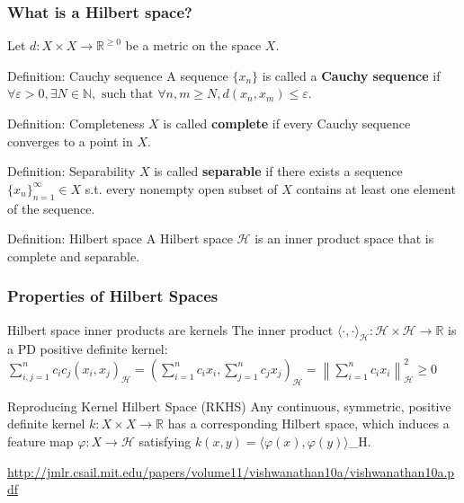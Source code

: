 \documentclass{beamer}
\begin{document}
    \begin{frame}
        \frametitle{What is a Hilbert space?}
            Let $d: X\times X \rightarrow \mathbb R^{\geq 0}$ be a metric on the space $X$. \\
        \begin{block}{Definition: Cauchy sequence}
            A sequence $\{x_n\}$ is called a \textbf{Cauchy sequence} if $\forall \varepsilon > 0, \exists N \in \mathbb{N}, \text{ such that } \forall n,m \geq N, d(x_n,x_m)\leq \varepsilon$. \\
        \end{block}
        \begin{block}{Definition: Completeness}
            $X$ is called \textbf{complete} if every Cauchy sequence converges to a point in $X$.
        \end{block}
        \begin{block}{Definition: Separability}
            $X$ is called \textbf{separable} if there exists a sequence $\{x_n\}_{n = 1}^\infty \in X$ s.t. every nonempty open subset of $X$ contains at least one element of the sequence.
        \end{block}
        \begin{block}{Definition: Hilbert space}
            A Hilbert space $\mathcal H$ is an inner product space that is complete and separable.
        \end{block}
    \end{frame}

    \begin{frame}
        \frametitle{Properties of Hilbert Spaces}
        \begin{block}{Hilbert space inner products are kernels}
            The inner product $\langle\cdot ,\cdot \rangle_{\mathcal H}:\mathcal H\times \mathcal H\to \mathbb {R}$ is a PD positive definite kernel:
            $\sum\limits_{i,j=1}^{n}c_{i}c_{j}(x_{i},x_{j})_{\mathcal H}=\left(\sum _{i=1}^{n}c_{i}x_{i},\sum\limits_{j=1}^{n}c_{j}x_{j}\right)_{\mathcal H}=\left\|\sum \limits_{i=1}^{n}c_{i}x_{i}\right\|_{\mathcal H}^{2}\geq 0$
        \end{block}

        \begin{block}{Reproducing Kernel Hilbert Space (RKHS)}
            Any continuous, symmetric, positive definite kernel $k: X \times X\rightarrow \mathbb R$ has a corresponding Hilbert space, which induces a feature map $\varphi: X \rightarrow \mathcal H$ satisfying $k(x,y) = \langle\varphi(x),\varphi(y)\rangle $_{\mathcal H}.
        \end{block}

        \tiny{\url{http://jmlr.csail.mit.edu/papers/volume11/vishwanathan10a/vishwanathan10a.pdf}}
    \end{frame}
\end{document}
